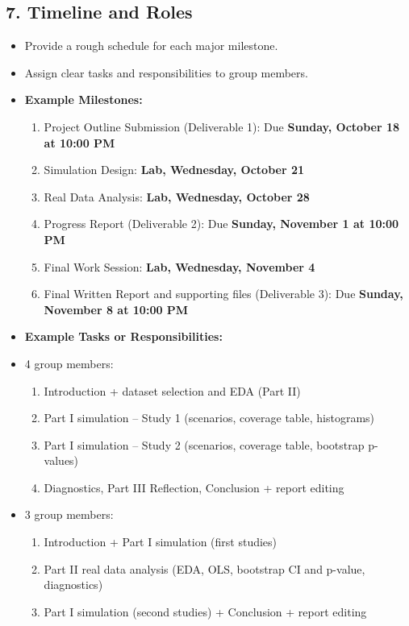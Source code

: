 \documentclass[12pt]{article}
\begin{document}
\subsection*{7. Timeline and Roles}
\begin{itemize}
    \item Provide a rough schedule for each major milestone.
    \item Assign clear tasks and responsibilities to group members.
    \item \textbf{Example Milestones:}
    \begin{enumerate}
        \item Project Outline Submission (Deliverable 1): Due \textbf{Sunday, October 18 at 10:00 PM}
        \item Simulation Design: \textbf{Lab, Wednesday, October 21}
        \item Real Data Analysis: \textbf{Lab, Wednesday, October 28}
        \item Progress Report (Deliverable 2): Due \textbf{Sunday, November 1 at 10:00 PM}
        \item Final Work Session: \textbf{Lab, Wednesday, November 4}
        \item Final Written Report and supporting files (Deliverable 3): Due \textbf{Sunday, November 8 at 10:00 PM}
    \end{enumerate}
    \item \textbf{Example Tasks or Responsibilities:}
    \item 4 group members:
    \begin{enumerate}
        \item Introduction + dataset selection and EDA (Part II)
        \item Part I simulation -- Study 1 (scenarios, coverage table, histograms)
        \item Part I simulation -- Study 2 (scenarios, coverage table, bootstrap p-values)
        \item Diagnostics, Part III Reflection, Conclusion + report editing
    \end{enumerate}
    \item 3 group members:
    \begin{enumerate}
        \item Introduction + Part I simulation (first studies)
        \item Part II real data analysis (EDA, OLS, bootstrap CI and p-value, diagnostics)
        \item Part I simulation (second studies) + Conclusion + report editing
    \end{enumerate}
\end{itemize}
\end{document}
